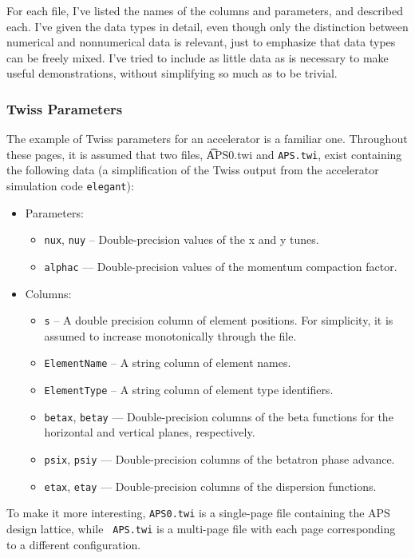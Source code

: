 \documentclass[11pt]{article}
\begin{document}
For each file, I've listed the names of the columns and parameters, and described each.  I've given the data types in
detail, even though only the distinction between numerical and nonnumerical data is relevant, just to emphasize that
data types can be freely mixed.  I've tried to include as little data as is necessary to make useful demonstrations,
without simplifying so much as to be trivial.

\subsubsection{Twiss Parameters}

The example of Twiss parameters for an accelerator is a familiar one.  Throughout these pages, it is assumed that two
files, {\t APS0.twi} and {\tt APS.twi}, exist containing the following data (a simplification of the Twiss output from the
accelerator simulation code \verb|elegant|):
\begin{itemize}
\item Parameters: 
        \begin{itemize} 
        \item {\tt nux}, {\tt nuy} -- Double-precision values of the x and y tunes.
        \item {\tt alphac} --- Double-precision values of the momentum compaction factor.
        \end{itemize}
\item Columns:
        \begin{itemize}
        \item {\tt s} -- A double precision column of element positions.  For simplicity, it is assumed to increase
                monotonically through the file.
        \item {\tt ElementName} -- A string column of element names.
        \item {\tt ElementType} -- A string column of element type identifiers.
        \item {\tt betax}, {\tt betay} --- Double-precision columns of the beta functions for the
        horizontal and vertical planes, respectively.
        \item {\tt psix}, {\tt psiy} --- Double-precision columns of the betatron phase advance.
        \item {\tt etax}, {\tt etay} --- Double-precision columns of the dispersion functions.
        \end{itemize}
\end{itemize}
To make it more interesting, {\tt APS0.twi} is a single-page file containing the APS design lattice, while {\tt
APS.twi} is a multi-page file with each page corresponding to a different configuration.
\end{document}

